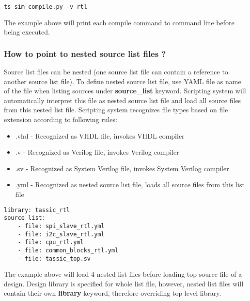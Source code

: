 \documentclass{tropic_design_spec}
\begin{document}
\begin{lstlisting}
ts_sim_compile.py -v rtl
\end{lstlisting}

The example above will print each compile command to command line before being executed.


\subsubsection{How to point to nested source list files ?} 
\label{sec:how-to-point-to-nested-source-list-file}

Source list files can be nested (one source list file can contain a reference to
another source list file). To define nested source list file, use YAML file as
name of the file when listing sources under \textbf{source_list} keyword. Scripting
system will automatically interpret this file as nested source list file and load all
source files from this nested list file. Scripting system recognizes file types based
on file extension according to following rules:

\begin{itemize}
    \item{.vhd     - Recognized as VHDL file, invokes VHDL compiler}
    \item{.v       - Recognized as Verilog file, invokes Verilog compiler}
    \item{.sv      - Recognized as System Verilog file, invokes System Verilog compiler}
    \item{.yml     - Recognized as nested source list file, loads all source files
                     from this list file}
\end{itemize}

\begin{lstlisting}
library: tassic_rtl
source_list:
    - file: spi_slave_rtl.yml
    - file: i2c_slave_rtl.yml
    - file: cpu_rtl.yml
    - file: common_blocks_rtl.yml
    - file: tassic_top.sv
\end{lstlisting}

The example above will load 4 nested list files before loading top source file of
a design. Design library is specified for whole list file, however, nested list
files will contain their own \textbf{library} keyword, therefore overriding top
level library. 
\end{document}
